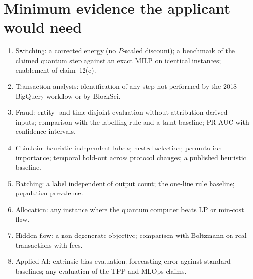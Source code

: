 \documentclass[10pt,a4paper]{article}
\begin{document}
\section{Minimum evidence the applicant would need}\label{sec:experiments}
\begin{enumerate}[label=E\arabic*.]
  \item Switching: a corrected energy (no $P$-scaled discount); a benchmark of the claimed quantum step against an exact MILP on identical instances; enablement of claim~12(c).
  \item Transaction analysis: identification of any step not performed by the 2018 BigQuery workflow or by BlockSci.
  \item Fraud: entity- and time-disjoint evaluation without attribution-derived inputs; comparison with the labelling rule and a taint baseline; PR-AUC with confidence intervals.
  \item CoinJoin: heuristic-independent labels; nested selection; permutation importance; temporal hold-out across protocol changes; a published heuristic baseline.
  \item Batching: a label independent of output count; the one-line rule baseline; population prevalence.
  \item Allocation: any instance where the quantum computer beats LP or min-cost flow.
  \item Hidden flow: a non-degenerate objective; comparison with Boltzmann on real transactions with fees.
  \item Applied AI: extrinsic bias evaluation; forecasting error against standard baselines; any evaluation of the TPP and MLOps claims.
\end{enumerate}

\end{document}
